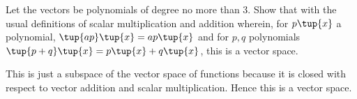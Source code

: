 \begin{enumialphparenastyle}
\begin{ex} Let the vectors be polynomials of degree no more than 3. Show that
with the usual definitions of scalar multiplication and addition wherein,
for $p\tup{x} $ a polynomial, $\tup{a p} \tup{
x} = a p\tup{x} $ and for $p,q$ polynomials $\tup{
p+q} \tup{x} =  p\tup{x} +q\tup{x} $, this
is a vector space.
\begin{sol}
This is just a subspace of the vector space of functions
because it is closed with respect to vector addition and scalar
multiplication. Hence this is a vector space.
\end{sol}
\end{ex}

\end{enumialphparenastyle}
